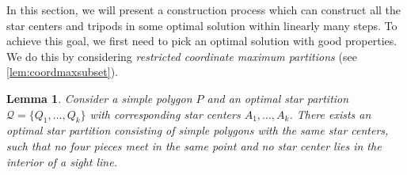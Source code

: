\documentclass[10pt,a4paper]{article}
\newtheorem{lemma}{Lemma}[section]
\begin{document}
In this section, we will present a construction process which can construct all the star centers and tripods in some optimal solution within linearly many steps. 
To achieve this goal, we first need to pick an optimal solution with good properties. We do this by considering \emph{restricted coordinate maximum partitions} (see \cref{lem:coordmaxsubset}).

\begin{lemma}
    Consider a simple polygon $P$ and an optimal star partition $\mathcal{Q} = \{ Q_1, \dots, Q_k \}$ with corresponding star centers $A_1,\ldots,A_k$.
    There exists an optimal star partition consisting of simple polygons with the same star centers, such that no four pieces meet in the same point and no star center lies in the interior of a sight line.  
\end{lemma}
\end{document}
